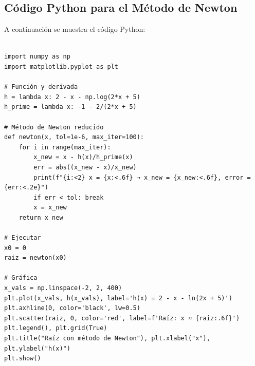 \documentclass[12pt]{article}
\begin{document}
\begin{center}
	
	\vspace{1cm}
	
	\section*{Código Python para el Método de Newton}
	
	A continuación se muestra el código Python:
	

\end{center}
    
    

\begin{tcolorbox}[title=Método de Newton,
                  colback=white,
                  colframe=black,
                  breakable, enhanced]
\begin{lstlisting}[style=mypython]

import numpy as np
import matplotlib.pyplot as plt

# Función y derivada
h = lambda x: 2 - x - np.log(2*x + 5)
h_prime = lambda x: -1 - 2/(2*x + 5)

# Método de Newton reducido
def newton(x, tol=1e-6, max_iter=100):
    for i in range(max_iter):
        x_new = x - h(x)/h_prime(x)
        err = abs((x_new - x)/x_new)
        print(f"{i:<2} x = {x:<.6f} → x_new = {x_new:<.6f}, error = {err:<.2e}")
        if err < tol: break
        x = x_new
    return x_new

# Ejecutar
x0 = 0
raiz = newton(x0)

# Gráfica
x_vals = np.linspace(-2, 2, 400)
plt.plot(x_vals, h(x_vals), label='h(x) = 2 - x - ln(2x + 5)')
plt.axhline(0, color='black', lw=0.5)
plt.scatter(raiz, 0, color='red', label=f'Raíz: x ≈ {raiz:.6f}')
plt.legend(), plt.grid(True)
plt.title("Raíz con método de Newton"), plt.xlabel("x"), plt.ylabel("h(x)")
plt.show()		
\end{lstlisting}
\end{tcolorbox}
\end{document}
